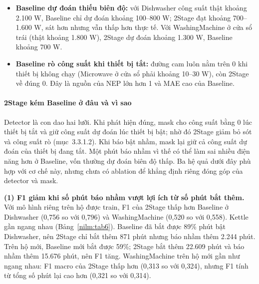 \begin{itemize}
\item \textbf{Baseline dự đoán thiếu biên độ:} với Dishwasher công suất thật khoảng 2.100 W, Baseline chỉ dự đoán khoảng 100–800 W; 2Stage đạt khoảng 700–1.600 W, sát hơn nhưng vẫn thấp hơn thực tế. Với WashingMachine ở cửa sổ trái (thật khoảng 1.800 W), 2Stage dự đoán khoảng 1.300 W, Baseline khoảng 700 W.
\item \textbf{Baseline rò công suất khi thiết bị tắt:} đường cam luôn nằm trên 0 khi thiết bị không chạy (Microwave ở cửa sổ phải khoảng 10–30 W), còn 2Stage về đúng 0. Đây là nguồn của NEP lớn hơn 1 và MAE cao của Baseline.
\end{itemize}

\paragraph{2Stage kém Baseline ở đâu và vì sao}

Detector là con dao hai lưỡi. Khi phát hiện đúng, mask cho công suất bằng 0 lúc thiết bị tắt và giữ công suất dự đoán lúc thiết bị bật; nhờ đó 2Stage giảm bỏ sót và công suất rò (mục~3.3.1.2). Khi báo bật nhầm, mask lại giữ cả công suất dự đoán của thiết bị đang tắt. Một phút báo nhầm vì thế có thể làm sai nhiều điện năng hơn ở Baseline, vốn thường dự đoán biên độ thấp. Ba hệ quả dưới đây phù hợp với cơ chế này, nhưng chưa có ablation để khẳng định riêng đóng góp của detector và mask.

\textbf{(1) F1 giảm khi số phút báo nhầm vượt lợi ích từ số phút bắt thêm.} Với mô hình riêng trên hộ được train, F1 của 2Stage thấp hơn Baseline ở Dishwasher (0,756 so với 0,796) và WashingMachine (0,520 so với 0,558). Kettle gần ngang nhau (Bảng~\ref{nilm:tab6}). Baseline đã bắt được 89\% phút bật Dishwasher, nên 2Stage chỉ bắt thêm 871 phút nhưng báo nhầm thêm 2.244 phút. Trên hộ mới, Baseline mới bắt được 59\%; 2Stage bắt thêm 22.609 phút và báo nhầm thêm 15.676 phút, nên F1 tăng. WashingMachine trên hộ mới gần như ngang nhau: F1 macro của 2Stage thấp hơn (0,313 so với 0,324), nhưng F1 tính từ tổng số phút lại cao hơn (0,321 so với 0,314).


